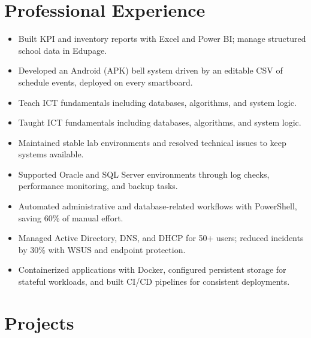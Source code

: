 \documentclass[a4paper,10pt]{article}
\begin{document}
\section*{Professional Experience}
\begin{itemize}
  \item Built KPI and inventory reports with Excel and Power BI; manage structured school data in Edupage.
  \item Developed an Android (APK) bell system driven by an editable CSV of schedule events, deployed on every smartboard.
  \item Teach ICT fundamentals including databases, algorithms, and system logic.
\end{itemize}
\begin{itemize}
  \item Taught ICT fundamentals including databases, algorithms, and system logic.
  \item Maintained stable lab environments and resolved technical issues to keep systems available.
\end{itemize}
\begin{itemize}
  \item Supported Oracle and SQL Server environments through log checks, performance monitoring, and backup tasks.
  \item Automated administrative and database-related workflows with PowerShell, saving 60\% of manual effort.
  \item Managed Active Directory, DNS, and DHCP for 50+ users; reduced incidents by 30\% with WSUS and endpoint protection.
\end{itemize}
\begin{itemize}
  \item Containerized applications with Docker, configured persistent storage for stateful workloads, and built CI/CD pipelines for consistent deployments.
\end{itemize}

\section*{Projects}
\pAWSRDS
\pAirflow
\pHive
\end{document}
